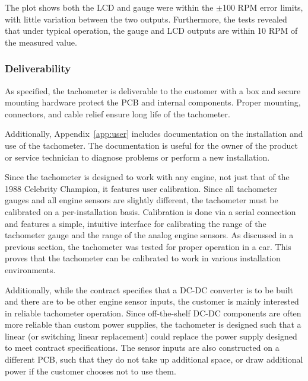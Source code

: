 The plot shows both the LCD and gauge were within the $\pm$100 RPM error limits, with little variation between the two outputs. Furthermore, the tests revealed that under typical operation, the gauge and LCD outputs are within 10 RPM of the measured value.

\subsubsection{Deliverability}
As specified, the tachometer is deliverable to the customer with a box and secure mounting hardware protect the PCB and internal components. Proper mounting, connectors, and cable relief ensure long life of the tachometer. 

Additionally, Appendix~\ref{app:user} includes documentation on the installation and use of the tachometer. The documentation is useful for the owner of the product or service technician to diagnose problems or perform a new installation.

Since the tachometer is designed to work with any engine, not just that of the 1988 Celebrity Champion, it features user calibration. Since all tachometer gauges and all engine sensors are slightly different, the tachometer must be calibrated on a per-installation basis. Calibration is done via a serial connection and features a simple, intuitive interface for calibrating the range of the tachometer gauge and the range of the analog engine sensors. As discussed in a previous section, the tachometer was tested for proper operation in a car. This proves that the tachometer can be calibrated to work in various installation environments.

Additionally, while the contract specifies that a DC-DC converter is to be built and there are to be other engine sensor inputs, the customer is mainly interested in reliable tachometer operation. Since off-the-shelf DC-DC components are often more reliable than custom power supplies, the tachometer is designed such that a linear (or switching linear replacement) could replace the power supply designed to meet contract specifications. The sensor inputs are also constructed on a different PCB, such that they do not take up additional space, or draw additional power if the customer chooses not to use them.

